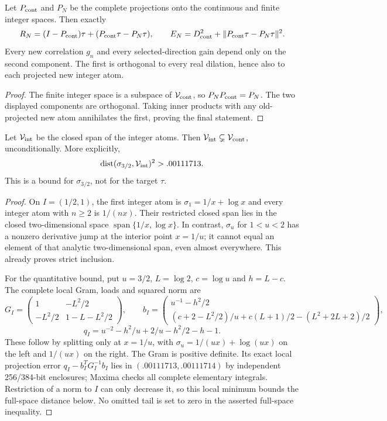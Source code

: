 \begin{corollary}
\label{cor:ns76-invisible-component}
Let $P_{\rm cont}$ and $P_N$ be the complete projections onto the
continuous and finite integer spaces. Then exactly
\[
 R_N=(I-P_{\rm cont})\tau+(P_{\rm cont}\tau-P_N\tau),
 \qquad
 E_N=D_{\rm cont}^2+\|P_{\rm cont}\tau-P_N\tau\|^2.
\]
Every new correlation $g_n$ and every selected-direction gain depend
only on the second component. The first is orthogonal to every real
dilation, hence also to each projected new integer atom.
\end{corollary}
\begin{proof}
The finite integer space is a subspace of $\mathcal V_{\rm cont}$,
so $P_NP_{\rm cont}=P_N$. The two displayed components are
orthogonal. Taking inner products with any old-projected new atom
annihilates the first, proving the final statement.
\end{proof}

\begin{proposition}
\label{prop:ns76-strict-closure}
Let $\mathcal V_{\rm int}$ be the closed span of the integer atoms.
Then $\mathcal V_{\rm int}\subsetneq\mathcal V_{\rm cont}$,
unconditionally. More explicitly,
\[
 \operatorname{dist}(\sigma_{3/2},\mathcal V_{\rm int})^2>.00111713.
\]
This is a bound for $\sigma_{3/2}$, not for the target $\tau$.
\end{proposition}
\begin{proof}
On $I=(1/2,1)$, the first integer atom is
$\sigma_1=1/x+\log x$ and every integer atom with $n\geq2$
is $1/(nx)$. Their restricted closed span lies in the closed
two-dimensional space $\operatorname{span}\{1/x,\log x\}$.
In contrast, $\sigma_u$ for $1<u<2$ has a nonzero derivative jump
at the interior point $x=1/u$; it cannot equal an element of that
analytic two-dimensional span, even almost everywhere. This already
proves strict inclusion.

For the quantitative bound, put $u=3/2$, $L=\log2$, $c=\log u$ and
$h=L-c$. The complete local Gram, loads and squared norm are
\[
 G_I=\begin{pmatrix}1&-L^2/2\\-L^2/2&1-L-L^2/2\end{pmatrix},\qquad
 b_I=\begin{pmatrix}
 u^{-1}-h^2/2\\
 (c+2-L^2/2)/u+c(L+1)/2-(L^2+2L+2)/2
 \end{pmatrix},
\]
\[
 q_I=u^{-2}-h^2/u+2/u-h^2/2-h-1.
\]
These follow by splitting only at $x=1/u$, with
$\sigma_u=1/(ux)+\log(ux)$ on the left and $1/(ux)$ on the right.
The Gram is positive definite. Its exact local projection error
$q_I-b_I^TG_I^{-1}b_I$ lies in $(.00111713,.00111714)$ by independent
256/384-bit enclosures; Maxima checks all complete elementary integrals.
Restriction of a norm to $I$ can only decrease it, so this local
minimum bounds the full-space distance below. No omitted tail is
set to zero in the asserted full-space inequality.
\end{proof}

